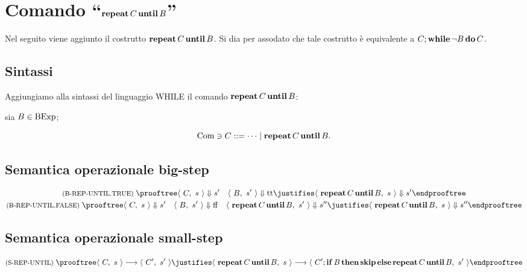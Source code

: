 \section{Comando ``$\mathop{\textup{\textbf{repeat}}} C \mathop{\textup{\textbf{until}}} B$''}

Nel seguito viene aggiunto il costrutto $\mathop{\textup{\textbf{repeat}}} C \mathop{\textup{\textbf{until}}} B$.
Si dia per assodato che tale costrutto è equivalente a
$C;\mathop{\textup{\textbf{while}}} \neg B \mathop{\textup{\textbf{do}}} C$.

\subsection{Sintassi}

Aggiungiamo alla sintassi del linguaggio WHILE il comando
$\mathop{\textup{\textbf{repeat}}} C \mathop{\textup{\textbf{until}}} B$:

sia $B \in \mathrm{BExp}$;

\[
  \Com \ni C ::= \dots \vbar \repeatuntil{C}{B}.
\]

\subsection{Semantica operazionale big-step}

\begin{gather*}
  \rulename{B-REP-UNTIL.TRUE}
  \prooftree
    \config{C}{s} \Downarrow s' \quad \config{B}{s'} \Downarrow \ttv
    \justifies \config{\repeatuntil{C}{B}}{s} \Downarrow s'
  \endprooftree
  \\
  \rulename{B-REP-UNTIL.FALSE}
  \prooftree
    \config{C}{s} \Downarrow s' \quad \config{B}{s'} \Downarrow \ffv \quad \config{\repeatuntil{C}{B}}{s'} \Downarrow s''
    \justifies \config{\repeatuntil{C}{B}}{s} \Downarrow s''
  \endprooftree
\end{gather*}

\subsection{Semantica operazionale small-step}

\[
  \rulename{S-REP-UNTIL}
  \prooftree
    \config{C}{s} \ssarrow \config{C'}{s'}
    \justifies \config{\repeatuntil{C}{B}}{s} \ssarrow \config{C';\condif{B}{\kw{skip}}{\repeatuntil{C}{B}}}{s'}
  \endprooftree
\]

